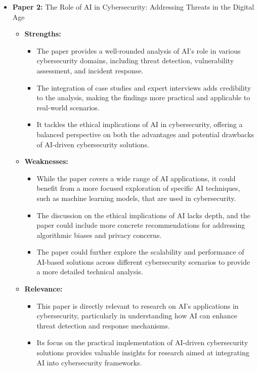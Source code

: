 \documentclass{article}  %
\begin{document}
\begin{itemize}
    \item \textbf{Paper 2:} The Role of AI in Cybersecurity: Addressing Threats in the Digital Age
    \begin{itemize}
        \item \textbf{Strengths:} 
        \begin{itemize}
            \item The paper provides a well-rounded analysis of AI's role in various cybersecurity domains, including threat detection, vulnerability assessment, and incident response.
            \item The integration of case studies and expert interviews adds credibility to the analysis, making the findings more practical and applicable to real-world scenarios.
            \item It tackles the ethical implications of AI in cybersecurity, offering a balanced perspective on both the advantages and potential drawbacks of AI-driven cybersecurity solutions.
        \end{itemize}
        \item \textbf{Weaknesses:} 
        \begin{itemize}
            \item While the paper covers a wide range of AI applications, it could benefit from a more focused exploration of specific AI techniques, such as machine learning models, that are used in cybersecurity.
            \item The discussion on the ethical implications of AI lacks depth, and the paper could include more concrete recommendations for addressing algorithmic biases and privacy concerns.
            \item The paper could further explore the scalability and performance of AI-based solutions across different cybersecurity scenarios to provide a more detailed technical analysis.
        \end{itemize}
        \item \textbf{Relevance:} 
        \begin{itemize}
            \item This paper is directly relevant to research on AI's applications in cybersecurity, particularly in understanding how AI can enhance threat detection and response mechanisms.
            \item Its focus on the practical implementation of AI-driven cybersecurity solutions provides valuable insights for research aimed at integrating AI into cybersecurity frameworks.
        \end{itemize}
    \end{itemize}
\end{itemize}
\end{document}
